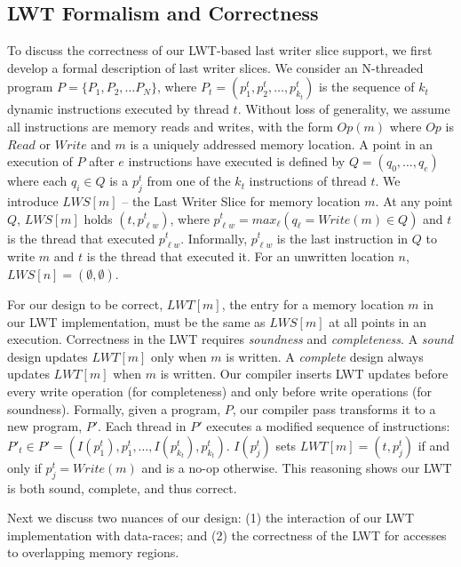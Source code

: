 \documentclass[preprint,10pt]{sigplanconf}
\newcommand{\lwt}{LWT\xspace}
\begin{document}
\subsection{\lwt Formalism and Correctness}
\label{sec:lwssoundness}
To discuss the correctness of our \lwt-based last writer slice support, we
first develop a formal description of last writer slices.  We consider an
N-threaded program $P = \{P_1, P_2, \ldots P_N\}$, where $P_t = (p^{t}_{1},
p^{t}_{2}, \ldots, p^{t}_{k_{t}})$ is the sequence of $k_{t}$ dynamic
instructions executed by thread $t$.  Without loss of generality, we assume all
instructions are memory reads and writes, with the form $Op(m)$ where $Op$ is
$Read$ or $Write$ and $m$ is a uniquely addressed memory location.
A point in an execution of $P$ after $e$ instructions have
executed is defined by $Q = (q_{0}, \ldots, q_{e})$ where each $q_{i} \in Q$ is a
$p^{t}_{j}$ from one of the $k_t$ instructions of thread $t$.  We introduce
$LWS[m]$ -- the Last Writer Slice for memory location $m$.   At any point $Q$,
$LWS[m]$ holds $(t,p^{t}_{\ell w})$, where $p^{t}_{\ell w} = max_{\ell}( 
q_{\ell} = Write(m) \in Q)$ and $t$ is the thread that
executed $p^{t}_{\ell w}$. Informally, $p^{t}_{\ell w}$ is the last instruction
in $Q$ to write $m$ and $t$ is the thread that executed it.  For an
unwritten location $n$, $LWS[n] = (\emptyset,\emptyset)$.

For our design to be correct, $LWT[m]$, the entry for a memory location $m$ in
our \lwt implementation, must be the same as $LWS[m]$ at all points in an
execution.  Correctness in the \lwt requires {\em soundness} and {\em
completeness}.  A {\em sound} design updates $LWT[m]$ only when $m$ is written.
A {\em complete} design always updates $LWT[m]$ when $m$ is written.  Our
compiler inserts \lwt updates before every write operation (for completeness)
and only before write operations (for soundness).  Formally, given a program,
$P$, our compiler pass transforms it to a new program, $P'$.  Each thread in
$P'$ executes a modified sequence of instructions: $P'_{t} \in P' = ( 
I(p^{t}_{1}), p^{t}_{1}, \ldots, I(p^{t}_{k_{t}}), p^{t}_{k_{t}} )$.
$I(p^{t}_{j})$ sets $LWT[m] = (t,p^{t}_{j})$ if and only if $p^{t}_{j} =
Write(m)$ and is a no-op otherwise.  This reasoning shows our \lwt is both
sound, complete, and thus correct.

Next we discuss two nuances of our design: (1) the interaction of our \lwt
implementation with data-races; and (2) the correctness of the
\lwt for accesses to overlapping memory regions. 
\end{document}
